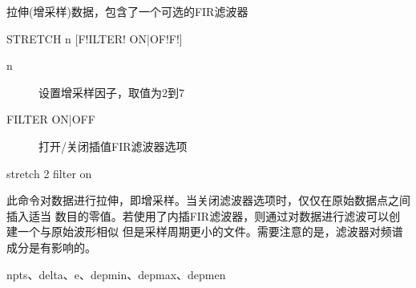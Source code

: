 \label{cmd:stretch}

拉伸(增采样)数据，包含了一个可选的FIR滤波器

\begin{SACSTX}
STRETCH  n [F!ILTER! ON|OF!F!]
\end{SACSTX}

\begin{description}
\item [n] 设置增采样因子，取值为2到7
\item [FILTER ON|OFF] 打开/关闭插值FIR滤波器选项
\end{description}

\begin{SACDFT}
stretch 2 filter on
\end{SACDFT}

此命令对数据进行拉伸，即增采样。当关闭滤波器选项时，仅仅在原始数据点之间插入适当
数目的零值。若使用了内插FIR滤波器，则通过对数据进行滤波可以创建一个与原始波形相似
但是采样周期更小的文件。需要注意的是，滤波器对频谱成分是有影响的。

npts、delta、e、depmin、depmax、depmen
